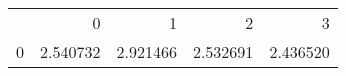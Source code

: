 \begin{tabular}{lrrrr}
 & 0 & 1 & 2 & 3 \\
0 & 2.540732 & 2.921466 & 2.532691 & 2.436520 \\
\end{tabular}
